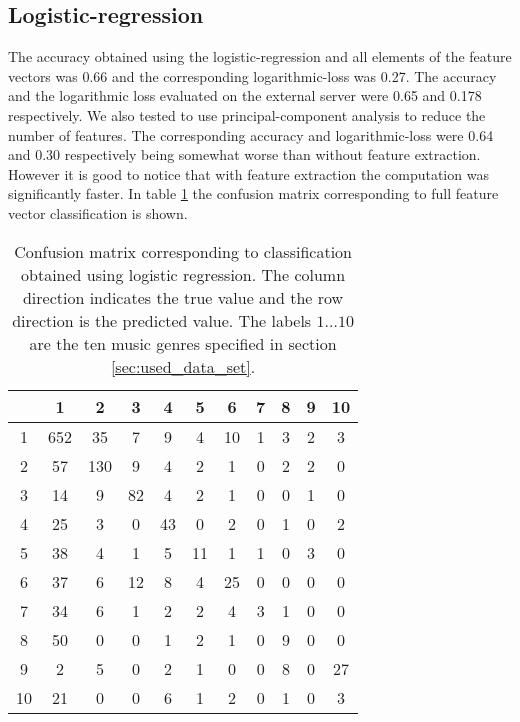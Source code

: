 \documentclass[aps,prb,10pt,twocolumn,groupedaddress]{revtex4-1}
\begin{document}
\subsection{Logistic-regression}
\label{sec:result_logistic_regression}
The accuracy obtained using the logistic-regression and all elements of the
feature vectors was 0.66 and the corresponding logarithmic-loss was 0.27. The
accuracy and the logarithmic loss evaluated on the external server were 0.65 and
0.178 respectively. We also tested to use principal-component analysis to reduce
the number of features. The corresponding accuracy and logarithmic-loss were
0.64 and 0.30 respectively being somewhat worse than without feature
extraction. However it is good to notice that with feature extraction the
computation was significantly faster. In table \ref{tab:confusion_log_reg} the
confusion matrix corresponding to full feature vector classification is shown.
\begin{center}
  \begin{table}
    \caption{Confusion matrix corresponding to classification obtained using
      logistic regression. The column direction indicates the true value and
      the row direction is the predicted value.  The labels $1\ldots10$ are
      the ten music genres specified in section \ref{sec:used_data_set}.}
    \begin{tabular*}{0.45\textwidth}{@{\extracolsep{\fill}}c|cccccccccc}
        & 1 & 2 & 3 & 4 & 5 & 6 & 7 & 8 & 9 & 10\\
      \hline
      1 & 652 & 35 & 7 & 9 & 4 & 10 & 1 & 3 & 2 & 3\\
      2 & 57 & 130 & 9 & 4 & 2 & 1 & 0 & 2 & 2 & 0\\
      3 & 14 & 9 & 82 & 4 & 2 & 1 & 0 & 0 & 1 & 0 \\
      4 & 25 & 3 & 0 & 43 & 0 & 2 & 0 & 1 & 0 & 2 \\
      5 & 38 & 4 & 1 & 5 & 11 & 1 & 1 & 0 & 3 & 0 \\
      6 & 37 & 6 & 12 & 8 & 4 & 25 & 0 & 0 & 0 & 0 \\
      7 & 34 & 6 & 1 & 2 & 2 & 4 & 3 & 1 & 0 & 0 \\
      8 & 50 & 0 & 0 & 1 & 2 & 1 & 0 & 9 & 0 & 0 \\
      9 & 2 & 5 & 0 & 2 & 1 & 0 & 0 & 8 & 0 & 27 \\
      10 & 21 & 0 & 0 & 6 & 1 & 2 & 0 & 1 & 0 & 3\\
      \end{tabular*}
    \label{tab:confusion_log_reg}
  \end{table}
\end{center}
\end{document}
